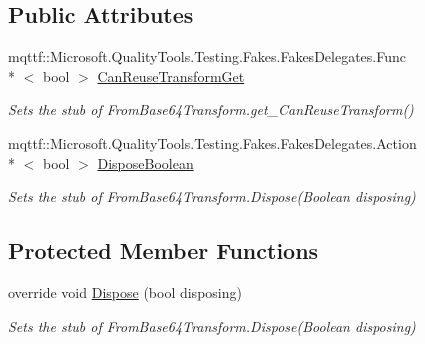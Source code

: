 \subsection*{Public Attributes}
\begin{DoxyCompactItemize}
\item 
mqttf\-::\-Microsoft.\-Quality\-Tools.\-Testing.\-Fakes.\-Fakes\-Delegates.\-Func\\*
$<$ bool $>$ \hyperlink{class_system_1_1_security_1_1_cryptography_1_1_fakes_1_1_stub_from_base64_transform_af0c0674f8ed2d4528e1549f915582b7e}{Can\-Reuse\-Transform\-Get}
\begin{DoxyCompactList}\small\item\em Sets the stub of From\-Base64\-Transform.\-get\-\_\-\-Can\-Reuse\-Transform()\end{DoxyCompactList}\item 
mqttf\-::\-Microsoft.\-Quality\-Tools.\-Testing.\-Fakes.\-Fakes\-Delegates.\-Action\\*
$<$ bool $>$ \hyperlink{class_system_1_1_security_1_1_cryptography_1_1_fakes_1_1_stub_from_base64_transform_aff5078cc56792c1420c8f075f2c8564c}{Dispose\-Boolean}
\begin{DoxyCompactList}\small\item\em Sets the stub of From\-Base64\-Transform.\-Dispose(\-Boolean disposing)\end{DoxyCompactList}\end{DoxyCompactItemize}
\subsection*{Protected Member Functions}
\begin{DoxyCompactItemize}
\item 
override void \hyperlink{class_system_1_1_security_1_1_cryptography_1_1_fakes_1_1_stub_from_base64_transform_a47ff325bfce65c1232def7618511c692}{Dispose} (bool disposing)
\begin{DoxyCompactList}\small\item\em Sets the stub of From\-Base64\-Transform.\-Dispose(\-Boolean disposing)\end{DoxyCompactList}\end{DoxyCompactItemize}
